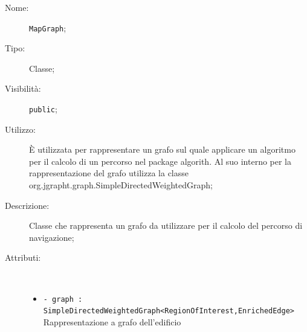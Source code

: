 \documentclass[../DefinizioneDiProdotto.tex]{subfiles}
\begin{document}
    \begin{description}
\item[Nome:] \texttt{MapGraph};
\item[Tipo:] Classe;
\item[Visibilità:] \texttt{public};
\item[Utilizzo:] È utilizzata per rappresentare un grafo sul quale applicare un algoritmo per il calcolo di un percorso nel package algorith. Al suo interno per la rappresentazione del grafo utilizza la classe org.jgrapht.graph.SimpleDirectedWeightedGraph;
\item[Descrizione:] Classe che rappresenta un grafo da utilizzare per il calcolo del percorso di navigazione;
\item[Attributi:] \
\begin{itemize}
\item \texttt{- graph : SimpleDirectedWeightedGraph<RegionOfInterest,EnrichedEdge>}\\
Rappresentazione a grafo dell'edificio


\end{itemize}
\end{description}
\end{document}
